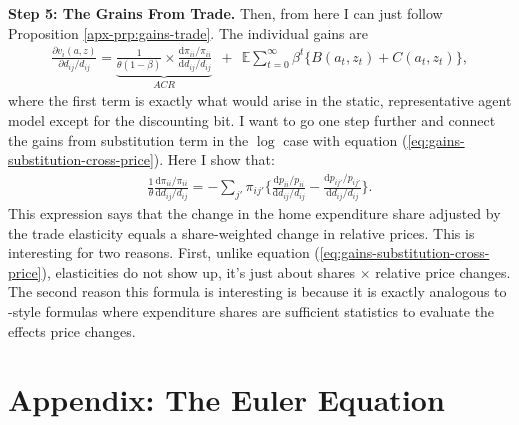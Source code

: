 \documentclass[12pt,pdftex]{article}
\begin{document}
\begin{onehalfspacing}
\textbf{Step 5: The Grains From Trade.} Then, from here I can just follow Proposition \ref{apx-prp:gains-trade}. The individual gains are
\begin{align}
\nonumber
\frac{\partial v_i(a, z)}{\partial d_{ij} / d_{ij}} = \underbrace{\frac{1}{\theta (1-\beta)} \times \frac{\mathrm{d} \pi_{ii} / \pi_{ii}}{\mathrm{d}d_{ij} / d_{ij}}}_{ACR} \ \ + \ \
\mathbb{E} \sum_{t = 0}^{\infty} \beta^{t} \bigg \{ B(a_{t},z_{t}) + C(a_{t},z_{t}) \bigg \},
\end{align}
where the first term is exactly what would arise in the static, representative agent model except for the discounting bit. I want to go one step further and connect the gains from substitution term in the $\log$ case with equation (\ref{eq:gains-substitution-cross-price}). Here I show that:
\begin{align}
\frac{1}{\theta} \frac{\mathrm{d} \pi_{ii} / \pi_{ii}}{\mathrm{d}d_{ij} / d_{ij}} = -\sum_{j'} \pi_{ij'} \bigg \{ \frac{\mathrm{d} p_{ii} / p_{ii}}{\mathrm{d}d_{ij} / d_{ij}} - \frac{\mathrm{d} p_{ij'} / p_{ij'}}{\mathrm{d}d_{ij} / d_{ij}} \bigg \}.
\end{align}
This expression says that the change in the home expenditure share adjusted by the trade elasticity equals a share-weighted change in relative prices. This is interesting for two reasons. First, unlike equation (\ref{eq:gains-substitution-cross-price}), elasticities do not show up, it's just about shares $\times$ relative price changes. The second reason this formula is interesting is because it is exactly analogous to \citet{deaton1989rice}-style formulas where expenditure shares are sufficient statistics to evaluate the effects price changes.


\section{Appendix: The Euler Equation}


\end{onehalfspacing}
\end{document}
